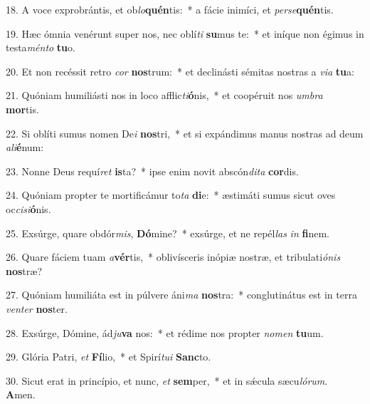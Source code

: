 18. A voce exprobrántis, et ob\textit{lo}\textbf{quén}tis:~*  a fácie inimíci, et \textit{per}\textit{se}\textbf{quén}tis.\

19. Hæc ómnia venérunt super nos, nec oblí\textit{ti} \textbf{su}mus te:~*  et iníque non égimus in testa\textit{mén}\textit{to} \textbf{tu}o.\

20. Et non recéssit retro \textit{cor} \textbf{nos}trum:~*  et declinásti sémitas nostras a \textit{vi}\textit{a} \textbf{tu}a:\

21. Quóniam humiliásti nos in loco afflic\textit{ti}\textbf{ó}nis,~*  et coopéruit nos \textit{um}\textit{bra} \textbf{mor}tis.\

22. Si oblíti sumus nomen De\textit{i} \textbf{nos}tri,~*  et si expándimus manus nostras ad deum \textit{a}\textit{li}\textbf{é}num:\

23. Nonne Deus requí\textit{ret} \textbf{is}ta?~*  ipse enim novit abscón\textit{di}\textit{ta} \textbf{cor}dis.\

24. Quóniam propter te mortificámur to\textit{ta} \textbf{di}e:~*  æstimáti sumus sicut oves oc\textit{ci}\textit{si}\textbf{ó}nis.\

25. Exsúrge, quare obdór\textit{mis}, \textbf{Dó}mine?~*  exsúrge, et ne repél\textit{las} \textit{in} \textbf{fi}nem.\

26. Quare fáciem tuam \textit{a}\textbf{vér}tis,~*  oblivísceris inópiæ nostræ, et tribulati\textit{ó}\textit{nis} \textbf{nos}træ?\

27. Quóniam humiliáta est in púlvere áni\textit{ma} \textbf{nos}tra:~*  conglutinátus est in terra \textit{ven}\textit{ter} \textbf{nos}ter.\

28. Exsúrge, Dómine, ád\textit{ju}\textbf{va} nos:~*  et rédime nos propter \textit{no}\textit{men} \textbf{tu}um.\

29. Glória Patri, \textit{et} \textbf{Fí}lio,~*  et Spirí\textit{tu}\textit{i} \textbf{Sanc}to.\

30. Sicut erat in princípio, et nunc, \textit{et} \textbf{sem}per,~*  et in sǽcula sæcu\textit{ló}\textit{rum}. \textbf{A}men.\


